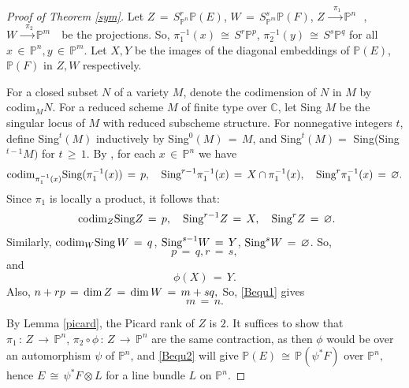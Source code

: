 \documentclass[12pt,reqno]{amsart}
\theoremstyle{definition}
\numberwithin{equation}{section}
\begin{document}
\begin{proof}[Proof of Theorem \ref{sym}]
Let $ Z\,=\, S_{\mathbb{P}^n}^{r} \mathbb{P}(E)$,  $ W \,=\, S^{s}_{\mathbb{P}^m} \mathbb{P}(F)$, $ Z \,\xrightarrow{\,\,\,\pi_{1}} \mathbb{P}^n\,\,\,$\,, $ W \,\xrightarrow{\,\,\,\pi_{2}} \mathbb{P}^m\,\,\,$\, be the projections. So, $ \pi_{1}^{-1}(x) \,\cong\, S^{r}\mathbb{P}^{p}$, $ \pi_{2}^{-1}(y)\,\cong\, S^{s}\mathbb{P}^q $ for all $x \,\in\, \mathbb{P}^n, y \,\in\, \mathbb{P}^m.$ Let $X,Y$ be the images of the diagonal embeddings of $ \mathbb{P}(E)$, $ \mathbb{P}(F)$ in $ Z, W$ respectively. 

For a closed subset $N$ of a variety $M$, denote the codimension of $N$ in $M$ by codim$_M N$. For a reduced scheme $M$ of finite type over $\mathbb{C}$, let Sing $M$ be the singular locus of $M$ with reduced subscheme structure. For nonnegative integers $t$, define Sing$^t(M)$ inductively by Sing$^0(M)\,=\,M$, and Sing$^t(M) = $ Sing(Sing$^{t-1} M)$ for $t\,\geq\, 1$. By {\cite[Theorem 2]{BansalSarkarVats2025_SymmetricPower}}, for each $ x \,\in\, \mathbb{P}^n$ we have $$\textnormal{codim}_{\pi_1^{-1}(x)} \textnormal{Sing}(\pi_{1}^{-1}(x))\,=\,p, \quad\textnormal{Sing}^{r-1} \pi_{1}^{-1}(x)\,=\, X\cap \pi_{1}^{-1}(x), \quad \textnormal{Sing}^{r} \pi_{1}^{-1}(x)\,=\, \varnothing .$$ Since $ \pi_{1}$ is locally a product, it follows that: 
  $$ \textnormal{ codim}_{Z} \textnormal{Sing}Z\,=\, p, \quad \textnormal{Sing}^{r-1} Z\,=\, X, \quad \textnormal{Sing}^r Z\,=\, \varnothing. $$
  Similarly, $ \textnormal{codim}_{W} \textnormal{Sing}\,W\,=\, q$, $ \textnormal{Sing}^{s-1}W\,=\,Y$, $ \textnormal{Sing}^{s}W \,=\, \varnothing$.  So, 
 \begin{equation}\label{Bequ1} 
   p\,=\,q, r\,=\,s,
  \end{equation}
  and 
  \begin{equation}\label{Bequ2}
 \phi(X)\,=\,Y.
\end{equation}
Also, $ n+rp\,=\, \textnormal{dim}\, Z\,=\, \textnormal{dim}\, W\,=\, m+sq,$ So, \eqref{Bequ1} gives 
\begin{equation}\label{Bequ3}
    m\,=\,n.
\end{equation}

By Lemma \ref{picard}, the Picard rank of $Z$ is $2.$ It suffices to show that $ \pi_{1}\, :\, Z \,\longrightarrow\, \mathbb{P}^n$, $ \pi_{2} \circ \phi\,:\, Z \,\longrightarrow\, \mathbb{P}^n$ are the same contraction, as then $\phi $ would be over an automorphism $ \psi$ of $ \mathbb{P}^n$, and \eqref{Bequ2} will give  $ \mathbb{P}(E) \,\cong\, \mathbb{P}(\psi^{\ast}F)$ over $ \mathbb{P}^n,$ hence $ E \,\cong\, \psi^{\ast}F \otimes L$ for a line bundle $L$ on $ \mathbb{P}^n.$   
 

\end{proof}
\end{document}
